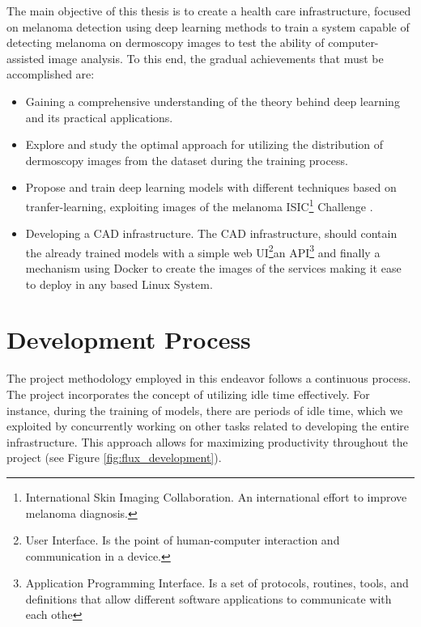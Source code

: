 The main objective of this thesis is to create a health care infrastructure,
focused on melanoma detection using deep learning methods to train a system
capable of detecting melanoma on dermoscopy images to test the ability of
computer-assisted image analysis. To this end, the gradual achievements that
must be accomplished are:

\begin{itemize}

  \item Gaining a comprehensive understanding of the theory
    behind deep learning and its practical applications.

  \item Explore and study the optimal approach for utilizing the distribution
    of dermoscopy images from the dataset during the training process.

  \item Propose and train deep learning models with different techniques based on
    tranfer-learning, exploiting images of the melanoma
    ISIC\footnote{International Skin Imaging Collaboration. An international
    effort to improve melanoma diagnosis.} Challenge \cite{IsicChallenge}.

  \item Developing a CAD infrastructure. The CAD infrastructure, should contain
    the already trained models with a simple web UI\footnote{User Interface. Is
    the point of human-computer interaction and communication in a device.}an
    API\footnote{Application Programming Interface. Is a set of protocols,
      routines, tools, and definitions that allow different software applications
    to communicate with each othe} and finally a mechanism using Docker to create
    the images of the services making it ease to deploy in any based Linux System.

\end{itemize}


\section*{Development Process}

The project methodology employed in this endeavor follows a continuous process.
The project incorporates the concept of utilizing idle time effectively. For
instance, during the training of models, there are periods of idle time, which
we exploited by concurrently working on other tasks related to developing the
entire infrastructure. This approach allows for maximizing productivity
throughout the project (see Figure \ref{fig:flux_development}).

